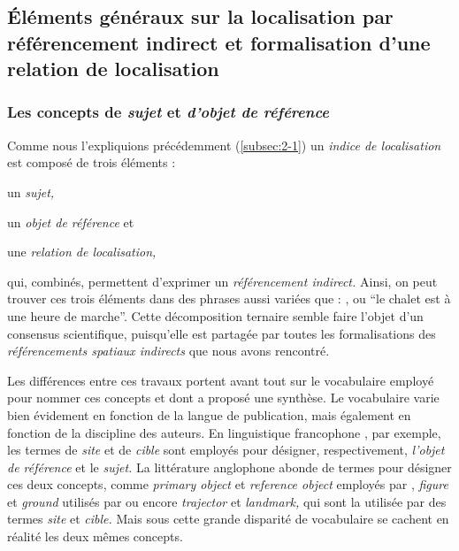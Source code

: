 
\subsection{Éléments généraux sur la localisation par référencement
  indirect et formalisation d'une relation de localisation}

\subsubsection{Les concepts de \emph{sujet} et \emph{d'objet de
    référence}}

Comme nous l'expliquions précédemment (\autoref{subsec:2-1}) un
\emph{indice de localisation} est composé de trois éléments :
%
\begin{enumerate*}[label=(\alph*)]
\item \label{i:site} un \emph{sujet,}
\item \label{i:cible} un \emph{objet de référence} et
\item une \emph{relation de localisation,}
\end{enumerate*}
%
qui, combinés, permettent d'exprimer un \emph{référencement indirect.}
Ainsi, on peut trouver ces trois éléments dans des phrases aussi
variées que : ,  ou \enquote{le chalet est à une
  heure de marche}. Cette décomposition ternaire semble faire l'objet
d'un consensus scientifique, puisqu'elle est partagée par toutes les
formalisations des \emph{référencements spatiaux indirects} que nous
avons rencontré.

Les différences entre ces travaux portent avant tout sur le
vocabulaire employé pour nommer ces concepts et dont
\textcite{RetzSchmidt1988} a proposé une synthèse. Le vocabulaire
varie bien évidement en fonction de la langue de publication, mais
également en fonction de la discipline des auteurs. En linguistique
francophone \autocite{Vandeloise1986,Borillo1998, Aurnague1997,
  Mathet2000}, par exemple, les termes de \emph{site} et de
\emph{cible} sont employés pour désigner, respectivement,
\emph{l'objet de référence} et le \emph{sujet.}
%
La littérature anglophone abonde de termes pour désigner ces deux
concepts, comme \emph{primary object} et \emph{reference object}
employés par \textcite{RetzSchmidt1988, Clementini2013}, \emph{figure}
et \emph{ground} utilisés par \textcite{Talmy1983} ou encore
\emph{trajector} et \emph{landmark,} qui sont la utilisée par
\textcite{Vandeloise1984} des termes \emph{site} et \emph{cible.}
%
Mais sous cette grande disparité de vocabulaire se cachent en réalité
les deux mêmes concepts.

